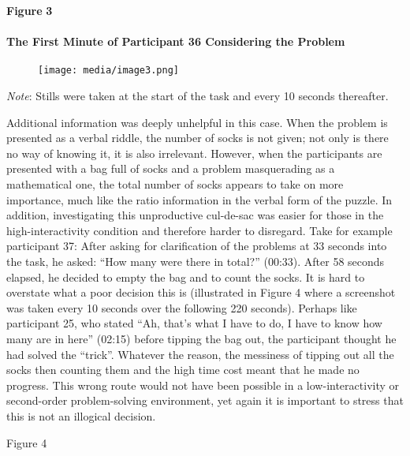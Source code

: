 \documentclass{article}
\begin{document}
\textbf{Figure }\textbf{3 }

\paragraph{The First Minute of Participant 36 Considering the Problem }


\begin{figure}

  \texttt{[image: media/image3.png]}
\caption{}
\label{}


\end{figure}


\emph{Note}: Stills were taken at the start of the task and every 10 seconds thereafter.



Additional information was deeply unhelpful in this case. When the problem is presented as a verbal riddle, the number of socks is not given; not only is there no way of knowing it, it is also irrelevant. However, when the participants are presented with a bag full of socks and a problem masquerading as a mathematical one, the total number of socks appears to take on more importance, much like the ratio information in the verbal form of the puzzle. In addition, investigating this unproductive cul-de-sac was easier for those in the high-interactivity condition and therefore harder to disregard. Take for example participant 37: After asking for clarification of the problems at 33 seconds into the task, he asked: “How many were there in total?” (00:33). After 58 seconds elapsed, he decided to empty the bag and to count the socks. It is hard to overstate what a poor decision this is (illustrated in Figure 4 where a screenshot was taken every 10 seconds over the following 220 seconds). Perhaps like participant 25, who stated “Ah, that's what I have to do, I have to know how many are in here” (02:15) before tipping the bag out, the participant thought he had solved the “trick”. Whatever the reason, the messiness of tipping out all the socks then counting them and the high time cost meant that he made no progress. This wrong route would not have been possible in a low-interactivity or second-order problem-solving environment, yet again it is important to stress that this is not an illogical decision. 




\begin{figure}

  

\end{figure}
Figure 4
\end{document}
